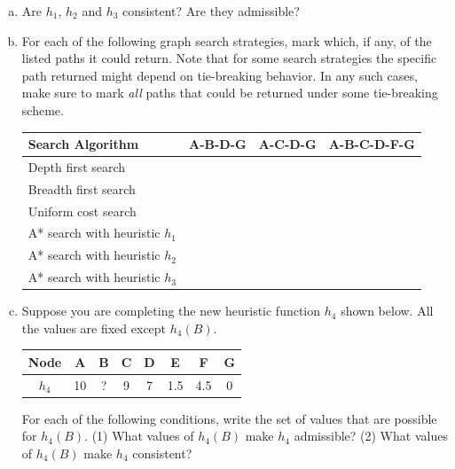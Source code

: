 \documentclass[a4paper]{article}
\begin{document}
\begin{enumerate}[(a)]
\item Are $h_1$, $h_2$ and $h_3$ consistent? Are they admissible? 

\vspace{4em}


\item For each of the following graph search strategies, mark which, if any, of the
listed paths it could return.   Note that for some search strategies
the specific path returned might depend on tie-breaking behavior.   In any such cases, make sure to mark
\emph{all} paths that could be returned under some tie-breaking scheme.

\vspace{.1in}
\begin{table}[!h]
\centering
\begin{tabular}{|l|c|c|c|}
\hline
Search Algorithm &  \textbf{A-B-D-G} & \textbf{A-C-D-G} &
\textbf{A-B-C-D-F-G} \\
\hline
Depth first search & & & \\
\hline
Breadth first search & & & \\
\hline
Uniform cost search & & & \\
\hline
A* search with heuristic $h_1$ & & &  \\
\hline
A* search with heuristic $h_2$ & & &  \\
\hline
A* search with heuristic $h_3$ & & & \\
\hline
\end{tabular}
\end{table}

\item Suppose you are completing the new heuristic function $h_4$ shown below.
All the values are fixed except $h_4(B)$. 

\begin{center}
\begin{tabular}{|c|c|c|c|c|c|c|c|}
\hline
Node & A & B & C & D & E & F & G \\
\hline
$h_4$& 10 & ?  & 9 & 7 & 1.5 & 4.5& 0 \\
\hline
\end{tabular}
\end{center}

For each of the following conditions, write the set of values that are possible for $h_4(B)$. (1) What values of $h_4(B)$ make $h_4$ admissible? (2) What values of $h_4(B)$ make $h_4$ consistent?


\end{enumerate}
\end{document}

